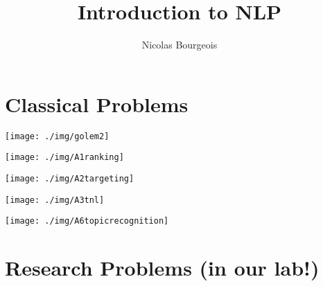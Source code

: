 \documentclass[11pt]{beamer}
\title{Introduction to NLP}
\author{Nicolas Bourgeois}
\date{}
\begin{document}
\begin{frame}
\maketitle
\end{frame}

\section{Classical Problems}

\begin{frame}{}

\texttt{[image: ./img/golem2]}
\end{frame}

\begin{frame}{}

\texttt{[image: ./img/A1ranking]}
\end{frame}

\begin{frame}{}

\texttt{[image: ./img/A2targeting]}

\end{frame}

\begin{frame}{}

\texttt{[image: ./img/A3tnl]}

\end{frame}


\begin{frame}{}

\texttt{[image: ./img/A6topicrecognition]}

\end{frame}


\section{Research Problems (in our lab!)}
\end{document}
